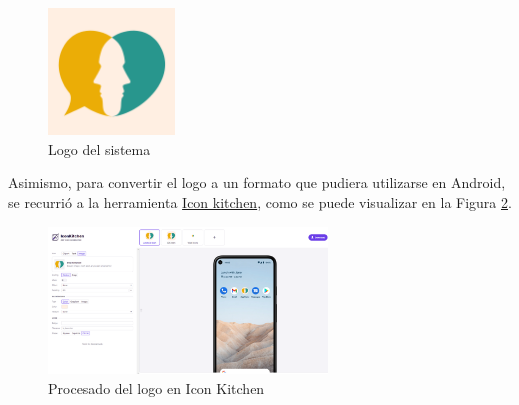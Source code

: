            \begin{figure}[h]
                \centering
                \includegraphics[width=0.3\textwidth]{figures/diseno/Logo app.png}
                \caption{Logo del sistema}
                \label{figure:disenio:logo}
            \end{figure}
            
            Asimismo, para convertir el logo a un formato que pudiera utilizarse en Android, se recurrió a la herramienta \href{https://icon.kitchen/}{Icon kitchen}, como se puede visualizar en la Figura \ref{figure:disenio:icon_litchen}.

            \begin{figure}[h]
                \centering
                \includegraphics[width=0.66\textwidth]{figures/diseno/Logo icon kitchen.png}
                \caption{Procesado del logo en Icon Kitchen}
                \label{figure:disenio:icon_litchen}
            \end{figure}